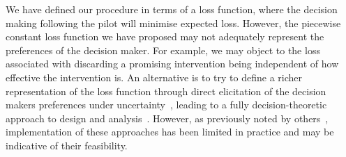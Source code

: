 \documentclass{article} %
\begin{document}


We have defined our procedure in terms of a loss function, where the decision making following the pilot will minimise expected loss. However, the piecewise constant loss function we have proposed may not adequately represent the preferences of the decision maker. For example, we may object to the loss associated with discarding a promising intervention being independent of how effective the intervention is. An alternative is to try to define a richer representation of the loss function through direct elicitation of the decision makers preferences under uncertainty~\cite{French2000}, leading to a fully decision-theoretic approach to design and analysis~\cite{Lindley1997}. However, as previously noted by others~\cite{Joseph1997a, Bacchetti2008, Whitehead2008}, implementation of these approaches has been limited in practice and may be indicative of their feasibility.
\end{document}
